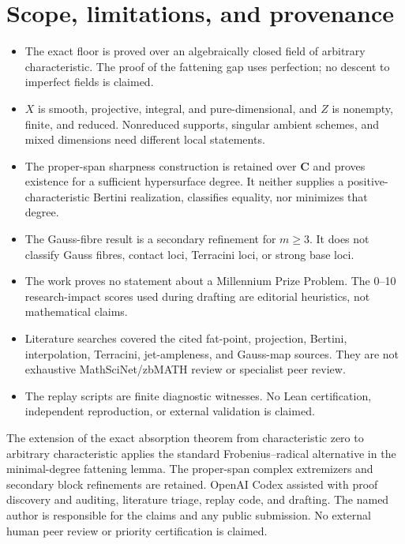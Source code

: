\documentclass[11pt]{article}
\newcommand{\CC}{\mathbf C}
\begin{document}
\section{Scope, limitations, and provenance}\label{sec:scope}

\begin{itemize}[leftmargin=*]
\item The exact floor is proved over an algebraically closed field of arbitrary
characteristic.  The proof of the fattening gap uses perfection; no descent to
imperfect fields is claimed.
\item $X$ is smooth, projective, integral, and pure-dimensional, and $Z$ is
nonempty, finite, and reduced.  Nonreduced supports, singular ambient schemes,
and mixed dimensions need different local statements.
\item The proper-span sharpness construction is retained over $\CC$ and proves
existence for a sufficient hypersurface degree.  It neither supplies a
positive-characteristic Bertini realization, classifies equality, nor
minimizes that degree.
\item The Gauss-fibre result is a secondary refinement for $m\geq3$.  It does
not classify Gauss fibres, contact loci, Terracini loci, or strong base loci.
\item The work proves no statement about a Millennium Prize Problem.  The
0--10 research-impact scores used during drafting are editorial heuristics,
not mathematical claims.
\item Literature searches covered the cited fat-point, projection, Bertini,
interpolation, Terracini, jet-ampleness, and Gauss-map sources.  They are not
exhaustive MathSciNet/zbMATH review or specialist peer review.
\item The replay scripts are finite diagnostic witnesses.  No Lean
certification, independent reproduction, or external validation is claimed.
\end{itemize}

The extension of the exact absorption theorem from characteristic zero to
arbitrary characteristic applies the standard Frobenius--radical alternative
in the minimal-degree fattening lemma.  The proper-span complex extremizers
and secondary block refinements are retained.
OpenAI Codex assisted with proof discovery and auditing, literature triage,
replay code, and drafting.  The named author is responsible for the claims
and any public submission.  No external human peer review or priority
certification is claimed.
\end{document}
